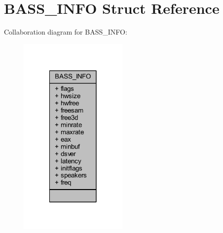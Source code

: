\hypertarget{struct_b_a_s_s___i_n_f_o}{\section{B\-A\-S\-S\-\_\-\-I\-N\-F\-O Struct Reference}
\label{struct_b_a_s_s___i_n_f_o}
}


Collaboration diagram for B\-A\-S\-S\-\_\-\-I\-N\-F\-O\-:\nopagebreak
\begin{figure}[H]
\begin{center}
\leavevmode
\includegraphics[width=150pt]{struct_b_a_s_s___i_n_f_o__coll__graph}
\end{center}
\end{figure}
